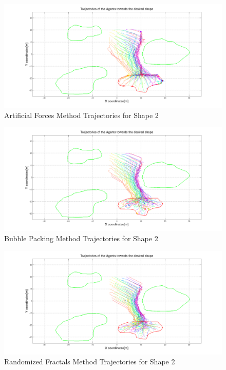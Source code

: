 \begin{figure}[H]
\caption{Artificial Forces Method Trajectories for Shape 2}
\centerline{\includegraphics[scale = 0.32]{Artificial_Trajectories_2}}
\end{figure} 	
		   
\begin{figure}[H]
\caption{Bubble Packing Method Trajectories for Shape 2}
\centerline{\includegraphics[scale = 0.32]{Bubble_Trajectories_2}}
\end{figure} 	
		   
\begin{figure}[H]
\caption{Randomized Fractals Method Trajectories for Shape 2}
\centerline{\includegraphics[scale = 0.32]{Randomized_Trajectories_2}}
\end{figure} 	
		   
